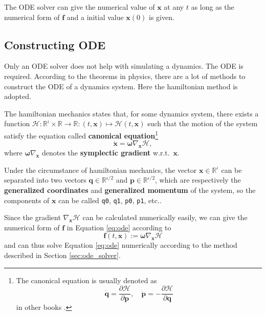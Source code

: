 \documentclass[12pt]{article}
\begin{document}
The ODE solver can give the numerical value of $\mathbf x$ at any $t$
as long as the numerical form of $\mathbf f$
and a initial value $\mathbf x\!\left(0\right)$
is given.

\subsection{Constructing ODE}

Only an ODE solver does not help with simulating a dynamics.
The ODE is required.
According to the theorems in physics,
there are a lot of methods to construct the ODE of a dynamics system.
Here the hamiltonian method is adopted.

The hamiltonian mechanics states that, for some dynamics system,
there exists a function
$\mathcal H:\mathbb R^\iota\times\mathbb R\rightarrow\mathbb R:\left(t,\mathbf x\right)\mapsto\mathcal H\!\left(t,\mathbf x\right)$
such that the motion of the system satisfy the equation
called \textbf{canonical equation}\footnote{
  The canonical equation is usually denoted as
  \begin{equation*}
    \dot{\mathbf q}=\frac{\partial\mathcal H}{\partial\mathbf p},
    \quad
    \dot{\mathbf p}=-\frac{\partial\mathcal H}{\partial\mathbf q}
  \end{equation*}
  in other books \cite{hand2008mechanics}\cite[p. 65]{arnold1989mathmech}\cite[p. 132]{landau1976mechanics}.
}
\begin{equation}
  \dot{\mathbf x}=\boldsymbol\omega\nabla_{\mathbf x}\mathcal H,
\end{equation}
where $\boldsymbol\omega\nabla_{\mathbf x}$ denotes the \textbf{symplectic gradient} w.r.t.\ $\mathbf x$.

Under the circumstance of hamiltonian mechanics,
the vector $\mathbf x\in\mathbb R^\iota$ can be separated into two vectors
$\mathbf q\in\mathbb R^{\iota/2}$ and $\mathbf p\in\mathbb R^{\iota/2}$,
which are respectively the \textbf{generalized coordinates} and \textbf{generalized momentum} of the system,
so the components of $\mathbf x$ can be called \texttt{q0}, \texttt{q1}, \texttt{p0}, \texttt{p1}, etc..

Since the gradient $\nabla_{\mathbf x}\mathcal H$ can be calculated numerically easily,
we can give the numerical form of $\mathbf f$ in Equation \ref{eq:ode} according to
\begin{equation}
  \mathbf f\!\left(t,\mathbf x\right):=\boldsymbol\omega\nabla_{\mathbf x}\mathcal H
  \label{eq:def_f}
\end{equation}
and can thus solve Equation \ref{eq:ode} numerically according to the method described in Section \ref{sec:ode_solver}.
\end{document}

